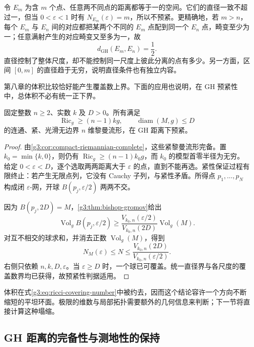 \begin{example}\label{g3:exm:equilateral-nonprecompact}
	令 \(E_m\) 为含 \(m\) 个点、任意两不同点的距离都等于一的空间。它们的直径一致不超过一，但当 \(0<\varepsilon<1\) 时有 \(N_{E_m}(\varepsilon)=m\)，所以不预紧。更精确地，若 \(m>n\)，每个 \(E_m\) 与 \(E_n\) 间的对应都把某两个不同的 \(E_m\) 点配到同一个 \(E_n\) 点，畸变至少为一；任意满射产生的对应畸变又至多为一，故
	\[
		d_{\mathrm{GH}}(E_m,E_n)=\frac12.
	\]
	直径控制了整体尺度，却不能控制同一尺度上彼此分离的点有多少。另一方面，区间 \([0,m]\) 的直径趋于无穷，说明直径条件也有独立内容。
\end{example}

第八章的体积比较恰好能产生覆盖数上界。下面的应用也说明，在 GH 预紧性中，总体积不必有统一正下界。

\begin{corollary}\label{g3:cor:ricci-diameter-gh-precompact}
	固定整数 \(n\ge2\)、实数 \(k\) 及 \(D>0\)。所有满足
	\[
		\operatorname{Ric}_g\ge(n-1)kg,\qquad
		\operatorname{diam}(M,g)\le D
	\]
	的连通、紧、光滑无边界 \(n\) 维黎曼流形，在 GH 距离下预紧。
\end{corollary}
\begin{proof}
	由\cref{g3:cor:compact-riemannian-complete}，这些紧黎曼流形完备。置 \(k_0=\min\{k,0\}\)，则仍有 \(\operatorname{Ric}_g\ge(n-1)k_0g\)，而 \(k_0\) 的模型首零半径为无穷。给定 \(0<\varepsilon<D\)，逐个选取两两距离大于 \(\varepsilon\) 的点，直到不能再选。紧性保证过程有限终止：若产生无限点列，它没有 Cauchy 子列，与紧性矛盾。所得点 \(p_1,\ldots,p_N\) 构成闭 \(\varepsilon\)-网，开球 \(B(p_j,\varepsilon/2)\) 两两不交。

	因为 \(B(p_j,2D)=M\)，\cref{g3:thm:bishop-gromov}给出
	\[
		\operatorname{Vol}_g B(p_j,\varepsilon/2)
		\ge\frac{V_{k_0,n}(\varepsilon/2)}{V_{k_0,n}(2D)}
		\operatorname{Vol}_g(M).
	\]
	对互不相交的球求和，并消去正数 \(\operatorname{Vol}_g(M)\)，得到
	\begin{equation}\label{g3:eq:ricci-covering-number}
		N_M(\varepsilon)\le N
		\le\frac{V_{k_0,n}(2D)}{V_{k_0,n}(\varepsilon/2)}.
	\end{equation}
	右侧只依赖 \(n,k,D,\varepsilon\)。当 \(\varepsilon\ge D\) 时，一个球已可覆盖。统一直径界与各尺度的覆盖数界均已获得，故预紧性判据适用。
\end{proof}

体积在式\eqref{g3:eq:ricci-covering-number}中被约去，因而这个结论容许一个方向不断缩短的平坦环面。极限的维数与局部拓扑需要额外的几何信息来判断；下一节将直接计算这种塌缩。

\subsection{GH 距离的完备性与测地性的保持}
\label{g3:subsec:1003:04}

